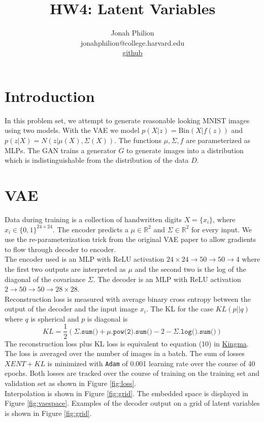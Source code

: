 \documentclass[11pt]{article}
\title{HW4: Latent Variables}
\author{Jonah Philion \\ jonahphilion@college.harvard.edu \\ \href{https://github.com/jonahthelion/cs287-s18/tree/master/HW2}{github}}
\begin{document}
\maketitle{}
\section{Introduction}

In this problem set, we attempt to generate reasonable looking MNIST images using two models. With the VAE we model $p(X|z)=\text{Bin}(X|f(z))$ and $p(z|X) = N(z|\mu(X),\Sigma(X))$. The functions $\mu,\Sigma,f$ are parameterized as MLPs. The GAN trains a generator $G$ to generate images into a distribution which is indistinguishable from the distribution of the data $D$.

\section{VAE}
Data during training is a collection of handwritten digits $X=\{x_i\}$, where $x_i \in \{0,1\}^{24 \times 24}$. The encoder predicts a $\mu \in \mathbb{R}^2$ and $\Sigma \in \mathbb{R}^2$ for every input. We use the re-parameterization trick from the original VAE paper to allow gradients to flow through decoder to encoder.\\
The encoder used is an MLP with ReLU activation $24 \times 24 \rightarrow 50 \rightarrow 50 \rightarrow 4$ where the first two outputs are interpreted as $\mu$ and the second two is the log of the diagonal of the covariance $\Sigma$. The decoder is an MLP with ReLU activation $2 \rightarrow 50 \rightarrow 50 \rightarrow 28 \times 28$.\\
Reconstruction loss is measured with average binary cross entropy between the output of the decoder and the input image $x_i$. The KL for the case $KL(p||q)$ where $q$ is spherical and $p$ is diagonal is
$$ KL = \frac{1}{2}(\Sigma.\texttt{sum()} + \mu.\texttt{pow(2).sum()}-2-\Sigma.\texttt{log().sum()}) $$
The reconstruction loss plus KL loss is equivalent to equation (10) in \href{https://arxiv.org/pdf/1312.6114.pdf}{Kingma}. The loss is averaged over the number of images in a batch. The sum of losses $XENT+ KL$ is minimized with \texttt{Adam} of 0.001 learning rate over the course of 40 epochs. Both losses are tracked over the course of training on the training set and validation set as shown in Figure \ref{fig:loss}.\\
Interpolation is shown in Figure \ref{fig:grid}. The embedded space is displayed in Figure \ref{fig:vaespace}. Examples of the decoder output on a grid of latent variables is shown in Figure \ref{fig:grid}.
\end{document}
